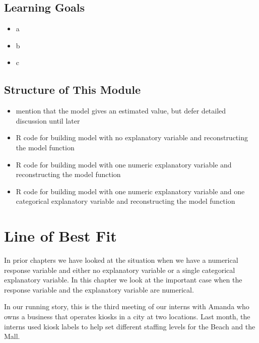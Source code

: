 \documentclass[
  12pt,
  letterpaper,
  DIV=11,
  numbers=noendperiod]{scrreprt}
\providecommand{\tightlist}{%
  \setlength{\itemsep}{0pt}\setlength{\parskip}{0pt}}
\begin{document}
\section*{Learning Goals}\label{learning-goals-3}


\begin{itemize}
\tightlist
\item
  a
\item
  b
\item
  c
\end{itemize}

\section*{Structure of This Module}\label{structure-of-this-module-3}


\begin{itemize}
\tightlist
\item
  mention that the model gives an estimated value, but defer detailed
  discussion until later
\item
  R code for building model with no explanatory variable and
  reconstructing the model function
\item
  R code for building model with one numeric explanatory variable and
  reconstructing the model function
\item
  R code for building model with one numeric explanatory variable and
  one categorical explanatory variable and reconstructing the model
  function
\end{itemize}

\chapter{Line of Best Fit}\label{sec-best-fit-line}

In prior chapters we have looked at the situation when we have a
numerical response variable and either no explanatory variable or a
single categorical explanatory variable. In this chapter we look at the
important case when the response variable and the explanatory variable
are numerical.

In our running story, this is the third meeting of our interns with
Amanda who owns a business that operates kiosks in a city at two
locations. Last month, the interns used kiosk labels to help set
different staffing levels for the Beach and the Mall.
\end{document}
